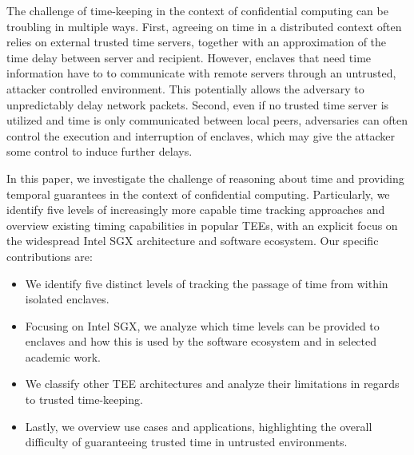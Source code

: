 \documentclass[sigplan,10pt]{acmart}
\begin{document}
The challenge of time-keeping in the context of confidential computing can be
troubling in multiple ways. First, agreeing on time in a distributed context
often relies on external trusted time servers, together with an approximation of
the time delay between server and recipient. However, enclaves that need time
information have to to communicate with remote servers through an untrusted,
attacker controlled environment. This potentially allows the adversary to
unpredictably delay network packets.%
Second, even if no trusted time server is utilized and time is
only communicated between local peers, adversaries can often control the
execution and interruption of enclaves, which may give the attacker some control
to induce further delays.%

In this paper, we investigate the challenge of reasoning about time 
and providing temporal guarantees 
in the context of confidential computing.
Particularly, we identify five levels of increasingly more capable time tracking
approaches and overview existing timing capabilities in popular TEEs, with
an explicit focus on the widespread Intel SGX architecture and software
ecosystem.
%
%
Our specific contributions are:
\begin{itemize}
	\item We identify five distinct levels of tracking the passage of time from
	within isolated enclaves.
	\item Focusing on Intel SGX, we analyze which time levels can be provided
	to enclaves and how this is used by the software ecosystem and in selected
	academic work.
 	\item We classify other TEE architectures and analyze their limitations in
 	regards to trusted time-keeping.
 	\item Lastly, we overview use cases and applications, highlighting the
 	overall difficulty of guaranteeing trusted time in untrusted environments.
\end{itemize}
\end{document}
